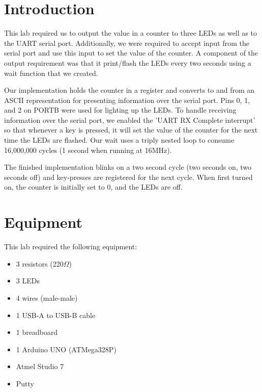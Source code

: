 \documentclass[letterpaper,11pt]{texMemo} %
\begin{document}
\maketitle %


\section*{Introduction}
This lab required us to output the value in a counter to three LEDs as well as to the UART serial port. Additionally, we were required to accept input from the serial port and use this input to set the value of the counter. A component of the output requirement was that it print/flash the LEDs every two seconds using a wait function that we created.

Our implementation holds the counter in a register and converts to and from an ASCII representation for presenting information over the serial port. Pins 0, 1, and 2 on PORTB were used for lighting up the LEDs. To handle receiving information over the serial port, we enabled the 'UART RX Complete interrupt' so that whenever a key is pressed, it will set the value of the counter for the next time the LEDs are flashed. Our wait uses a triply nested loop to consume 16,000,000 cycles (1 second when running at 16MHz).

The finished implementation blinks on a two second cycle (two seconds on, two seconds off) and key-presses are registered for the next cycle. When first turned on, the counter is initially set to 0, and the LEDs are off.


\section*{Equipment}
This lab required the following equipment:
\begin{itemize}
\item 3 resistors (220$\Omega$)
\item 3 LEDs
\item 4 wires (male-male)
\item 1 USB-A to USB-B cable
\item 1 breadboard
\item 1 Arduino UNO (ATMega328P)
\item Atmel Studio 7
\item Putty
\end{itemize}
\end{document}
